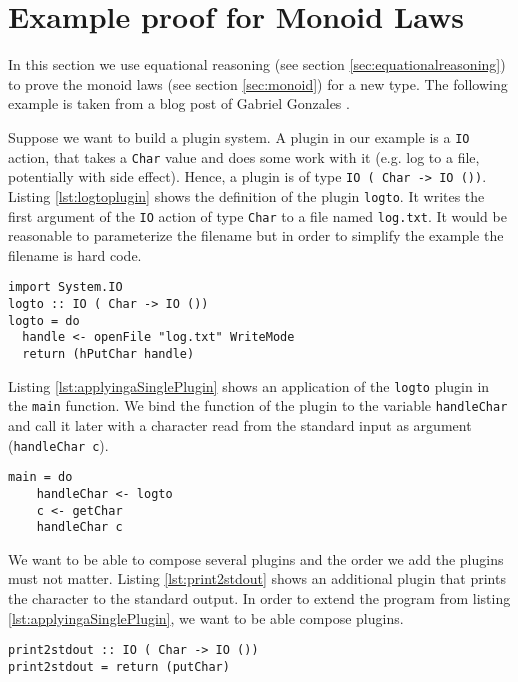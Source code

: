 \section{Example proof for Monoid Laws}
\label{sec:example}
In this section we use equational reasoning (see section \ref{sec:equationalreasoning}) to prove the monoid laws (see section \ref{sec:monoid}) for a new type.
The following example is taken from a blog post of Gabriel Gonzales \cite{gonzales14}. 

Suppose we want to build a plugin system. A plugin in our example is a \verb|IO| action, that takes a \verb|Char| value and does some work with it (e.g. log to a file, potentially with side effect). Hence, a plugin is of type \verb|IO ( Char -> IO ())|. Listing \ref{lst:logtoplugin} shows the definition of the plugin \verb|logto|. It writes the first argument of the \verb|IO| action of type \verb|Char| to a file named \verb|log.txt|. It would be reasonable to parameterize the filename but in order to simplify the example the filename is hard code.

\begin{lstlisting}[caption={Definition of a plugin. It writes a character to a file.}, label={lst:logtoplugin}]
import System.IO
logto :: IO ( Char -> IO ())
logto = do
  handle <- openFile "log.txt" WriteMode
  return (hPutChar handle)
\end{lstlisting}

Listing \ref{lst:applyingaSinglePlugin} shows an application of the \verb|logto| plugin in the \verb|main| function. We bind the function of the plugin to the variable \verb|handleChar| and call it later with a character read from the standard input as argument (\verb|handleChar c|).

\begin{lstlisting}[caption={Calling the logto IO action in main}, label={lst:applyingaSinglePlugin}]
main = do
    handleChar <- logto
    c <- getChar
    handleChar c
\end{lstlisting}

We want to be able to compose several plugins and the order we add the plugins must not matter. Listing \ref{lst:print2stdout} shows an additional plugin that prints the character to the standard output. In order to extend the program from listing \ref{lst:applyingaSinglePlugin}, we want to be able compose plugins. 

\begin{lstlisting}[caption={Definition of the plugin print2stdout}, label={lst:print2stdout}]
print2stdout :: IO ( Char -> IO ())
print2stdout = return (putChar)
\end{lstlisting}

